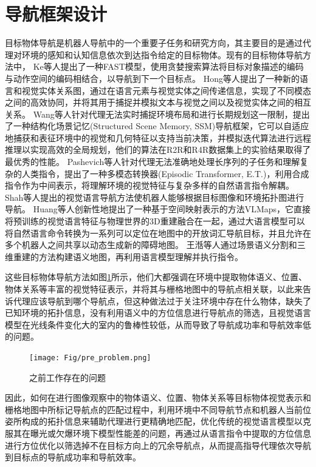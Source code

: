 \section{导航框架设计}
目标物体导航是机器人导航中的一个重要子任务和研究方向，其主要目的是通过代理对环境的感知和认知信息依次到达指令给定的目标物体。现有的目标物体导航方法中，
Ke\cite{ke2019tactical}等人提出了一种FAST模型，使用贪婪搜索算法将目标对象描述的编码与动作空间的编码相结合，以导航到下一个目标点。
Hong\cite{hong2020language}等人提出了一种新的语言和视觉实体关系图，通过在语言元素与视觉实体之间传递信息，实现了不同模态之间的高效协同，并将其用于捕捉并模拟文本与视觉之间以及视觉实体之间的相互关系。
Wang\cite{wang2021structured}等人针对代理无法实时捕捉环境布局和进行长期规划这一限制，提出了一种结构化场景记忆(Structured Scene Memory, SSM)导航框架，它可以自适应地捕获和表征环境中的视觉和几何特征以支持当前决策，并模拟迭代算法进行远程推理以实现高效的全局规划，他们的算法在R2R和R4R数据集上的实验结果取得了最优秀的性能。
Pashevich\cite{}等人针对代理无法准确地处理长序列的子任务和理解复杂的人类指令，提出了一种多模态转换器(Episodic Transformer, E.T.)，利用合成指令作为中间表示，将理解环境的视觉特征与复杂多样的自然语言指令解耦。
Shah\cite{shah2021ving}等人提出的视觉语言导航方法使机器人能够根据目标图像和环境拓扑图进行导航。
Huang\cite{huang2023visual}等人创新性地提出了一种基于空间映射表示的方法VLMaps，它直接将预训练的视觉语言特征与物理世界的3D重建融合在一起，通过大语言模型可以将自然语言命令转换为一系列可以定位在地图中的开放词汇导航目标，并且允许在多个机器人之间共享以动态生成新的障碍地图。
王湉\cite{王湉2024基于大语言模型的人机交互移动检测机器人导航方法}等人通过场景语义分割和三维重建的方法构建语义地图，再利用语言模型理解并执行指令。

这些目标物体导航方法如图\ref{preview_problem}所示，他们大都强调在环境中提取物体语义、位置、物体关系等丰富的视觉特征表示，并将其与栅格地图中的导航点相关联，以此来告诉代理应该导航到哪个导航点，但这种做法过于关注环境中存在什么物体，缺失了已知环境的拓扑信息，没有利用语义中的方位信息进行导航点的筛选，且视觉语言模型在光线条件变化大的室内的鲁棒性较低，从而导致了导航成功率和导航效率低的问题。
\begin{figure}[htbp]
    \centering
    \texttt{[image: Fig/pre\_problem.png]}
    \caption{\label{preview_problem}之前工作存在的问题}
\end{figure}

因此，如何在进行图像观察中的物体语义、位置、物体关系等目标物体视觉表示和栅格地图中所标记导航点的匹配过程中，利用环境中不同导航节点和机器人当前位姿所构成的拓扑信息来辅助代理进行更精确地匹配，优化传统的视觉语言模型以克服其在曝光或欠爆环境下模型性能差的问题，再通过从语言指令中提取的方位信息进行方位优化以筛选掉不在目标方向上的冗余导航点，从而提高指导代理依次导航到目标点的导航成功率和导航效率。

